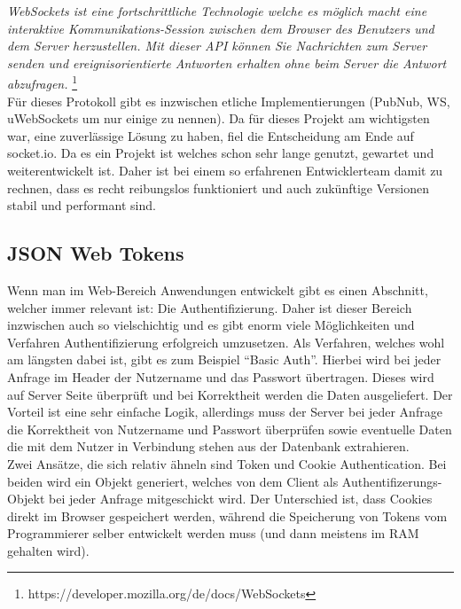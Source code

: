 \emph{\glqq   
WebSockets ist eine fortschrittliche Technologie welche es möglich macht eine interaktive Kommunikations-Session zwischen dem Browser des Benutzers und dem Server herzustellen. Mit dieser API können Sie Nachrichten zum Server senden und ereignisorientierte Antworten erhalten ohne beim Server die Antwort abzufragen.
\grqq} \footnote{https://developer.mozilla.org/de/docs/WebSockets} \\


Für dieses Protokoll gibt es inzwischen etliche Implementierungen (PubNub, WS, uWebSockets um nur einige zu nennen). Da für dieses Projekt am wichtigsten war, eine zuverlässige Lösung zu haben, fiel die Entscheidung am Ende auf socket.io. Da es ein Projekt ist welches schon sehr lange genutzt, gewartet und weiterentwickelt ist. Daher ist bei einem so erfahrenen Entwicklerteam damit zu rechnen, dass es recht reibungslos funktioniert und auch zukünftige Versionen stabil und performant sind.

\subsection{JSON Web Tokens} \label{JWT}

Wenn man im Web-Bereich Anwendungen entwickelt gibt es einen Abschnitt, welcher immer relevant ist: Die Authentifizierung. Daher ist dieser Bereich inzwischen auch so vielschichtig und es gibt enorm viele Möglichkeiten und Verfahren Authentifizierung erfolgreich umzusetzen. Als Verfahren, welches wohl am längsten dabei ist, gibt es zum Beispiel ``Basic Auth''. Hierbei wird bei jeder Anfrage im Header der Nutzername und das Passwort übertragen. Dieses wird auf Server Seite überprüft und bei Korrektheit werden die Daten ausgeliefert. Der Vorteil ist eine sehr einfache Logik, allerdings muss der Server bei jeder Anfrage die Korrektheit von Nutzername und Passwort überprüfen sowie eventuelle Daten die mit dem Nutzer in Verbindung stehen aus der Datenbank extrahieren. \\

Zwei Ansätze, die sich relativ ähneln sind Token und Cookie Authentication. Bei beiden wird ein Objekt generiert, welches von dem Client als Authentifizerungs-Objekt bei jeder Anfrage mitgeschickt wird. Der Unterschied ist, dass Cookies direkt im Browser gespeichert werden, während die Speicherung von Tokens vom Programmierer selber entwickelt werden muss (und dann meistens im RAM gehalten wird). \\

